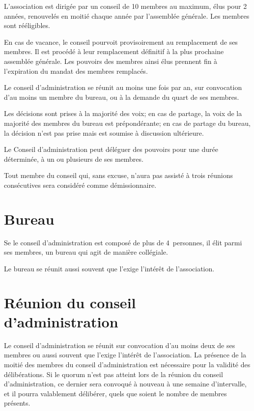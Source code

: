 \documentclass[12 pt]{article}
\begin{document}
L’association est dirigée par un conseil de 10 membres au maximum,
élus pour 2 années, renouvelés en moitié chaque année par l’assemblée
générale. Les membres sont rééligibles.

En cas de vacance, le conseil pourvoit provisoirement au remplacement
de ses membres. Il est procédé à leur remplacement définitif à la
plus prochaine assemblée générale. Les pouvoirs des membres ainsi élus
prennent fin à l’expiration du mandat des membres remplacés.

Le conseil d’administration se réunit au moins une fois par an, sur
convocation d’au moins un membre du bureau, ou à la demande du quart
de ses membres.

Les décisions sont prises à la majorité des voix; en cas de partage,
la voix de la majorité des membres du bureau est prépondérante; en cas
de partage du bureau, la décision n’est pas prise mais est soumise à
discussion ultérieure.

Le Conseil d’administration peut déléguer des pouvoirs pour une durée
déterminée, à un ou plusieurs de ses membres.

Tout membre du conseil qui, sans excuse, n’aura pas assisté à trois
réunions consécutives sera considéré comme démissionnaire.

\section{Bureau}
\label{sec:reunion-du-bureau}

Se le conseil d'administration est composé de plus de 4~personnes, il
élit parmi ses membres, un bureau qui agit de manière collégiale.

Le bureau se réunit aussi souvent que l'exige l'intérêt de
l'association.

\section{Réunion du conseil d'administration}
\label{sec:reunion-du-conseil-d-administration}

Le conseil d'administration se réunit sur convocation d'au moins deux
de ses membres ou aussi souvent que l'exige l'intérêt de
l'association. La présence de la moitié des membres du conseil
d'administration est nécessaire pour la validité des délibérations. Si
le quorum n'est pas atteint lors de la réunion du conseil
d'administration, ce dernier sera convoqué à nouveau à une semaine
d'intervalle, et il pourra valablement délibérer, quels que soient le
nombre de membres présents.
\end{document}
